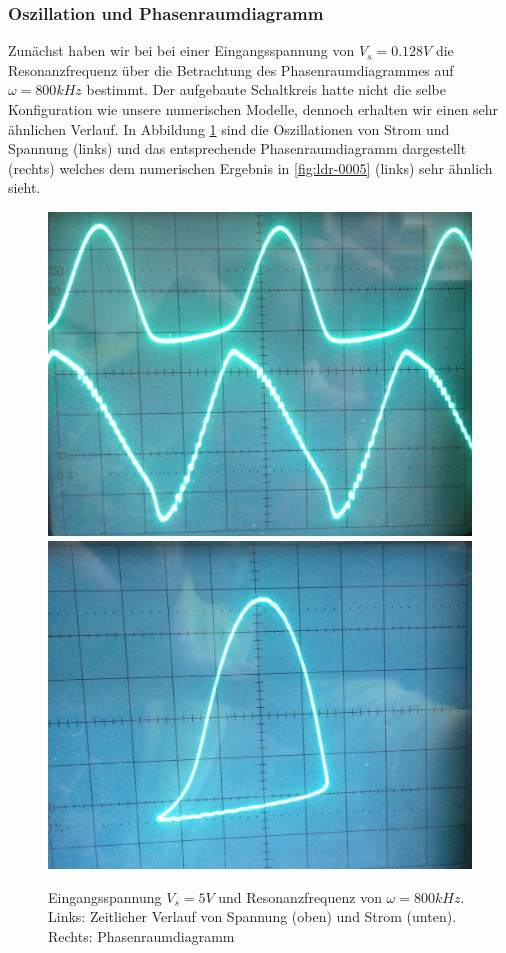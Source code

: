 \documentclass[11,5pt, twoside]{article}
\begin{document}
\subsubsection { Oszillation und Phasenraumdiagramm }
Zunächst haben wir bei bei einer Eingangsspannung von $V_s=0.128V$ die Resonanzfrequenz über die Betrachtung des Phasenraumdiagrammes auf $\omega=800kHz$ bestimmt. 
Der aufgebaute Schaltkreis hatte nicht die selbe Konfiguration wie unsere numerischen Modelle, dennoch erhalten wir einen sehr ähnlichen Verlauf. In Abbildung \ref{fig:ldr-real1} sind die Oszillationen von Strom und Spannung (links) und das entsprechende Phasenraumdiagramm dargestellt (rechts) welches dem numerischen Ergebnis in \ref{fig:ldr-0005} (links) sehr ähnlich sieht. 
\begin{figure}[!htbp]
\centering
\includegraphics[scale=0.1]{800khz-5V-oszi}
\includegraphics[scale=0.11]{800khz-5V-phase}
\caption{Eingangsspannung $V_s=5V$ und Resonanzfrequenz von $\omega=800kHz$. Links: Zeitlicher Verlauf von Spannung (oben) und Strom (unten). Rechts: Phasenraumdiagramm}
\label{fig:ldr-real1}
\end{figure}
\end{document}
